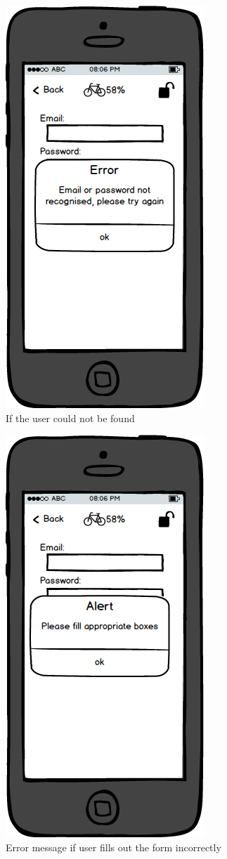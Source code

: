 \documentclass[a4paper]{report}
\begin{document}
\clearpage\begin{figure}
\centering
\includegraphics[scale=0.9]{figures/prototype_2/add_user_unrecognised}
\caption{If the user could not be found}
\end{figure}
\clearpage
\begin{figure}
\centering
\includegraphics[scale=0.9]{figures/prototype_2/add_user_boxes_err}
\caption{Error message if user fills out the form incorrectly}
\end{figure}
\end{document}
